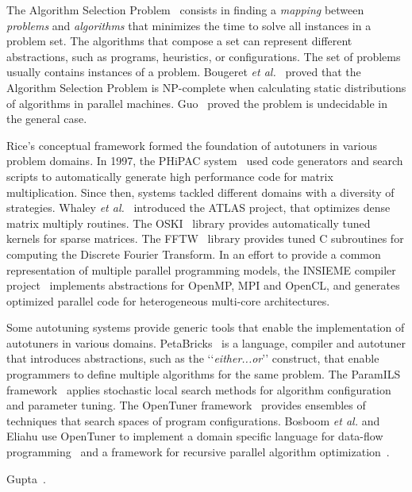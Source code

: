 \documentclass[a4paper, 12pt]{article}
\begin{document}
The Algorithm Selection Problem~\cite{rice1976algorithm} consists in finding a
\emph{mapping} between \emph{problems} and \emph{algorithms} that minimizes the
time to solve all instances in a problem set. The algorithms that compose a set
can represent different abstractions, such as programs, heuristics, or
configurations. The set of problems usually contains instances of a problem.
Bougeret \emph{et al.}~\cite{bougeret2009combining} proved that the Algorithm
Selection Problem is NP-complete when calculating static distributions of
algorithms in parallel machines.  Guo~\cite{guo2003algorithm} proved the
problem is undecidable in the general case.

Rice's conceptual framework formed the foundation of autotuners in various
problem domains.  In 1997, the PHiPAC system~\cite{bilmes1997phipac} used code
generators and search scripts to automatically generate high performance code
for matrix multiplication. Since then, systems tackled different domains with a
diversity of strategies. Whaley \emph{et al.}~\cite{whaley1998atlas} introduced
the ATLAS project, that optimizes dense matrix multiply routines. The
OSKI~\cite{vuduc2005oski} library provides automatically tuned kernels for
sparse matrices. The FFTW~\cite{frigo1998fftw} library provides tuned C
subroutines for computing the Discrete Fourier Transform.  In an effort to
provide a common representation of multiple parallel programming models, the
INSIEME compiler project~\cite{jordan2012multi} implements abstractions for
OpenMP, MPI and OpenCL, and generates optimized parallel code for heterogeneous
multi-core architectures.

Some autotuning systems provide generic tools that enable the implementation of
autotuners in various domains. PetaBricks~\cite{ansel2009petabricks} is a
language, compiler and autotuner that introduces abstractions, such as the
\lq\lq{}\emph{either...or}\rq\rq{} construct, that enable programmers to define
multiple algorithms for the same problem.  The ParamILS
framework~\cite{hutter2009paramils} applies stochastic local search methods
for algorithm configuration and parameter tuning.  The OpenTuner
framework~\cite{ansel2014opentuner} provides ensembles of techniques that
search spaces of program configurations. Bosboom \emph{et al.} and Eliahu use
OpenTuner to implement a domain specific language for data-flow
programming~\cite{bosboom2014streamjit} and a framework for recursive parallel
algorithm optimization~\cite{eliahu2015frpa}.

Gupta~\cite{gupta2012exploring,gupta2014evaluating}.
\end{document}
